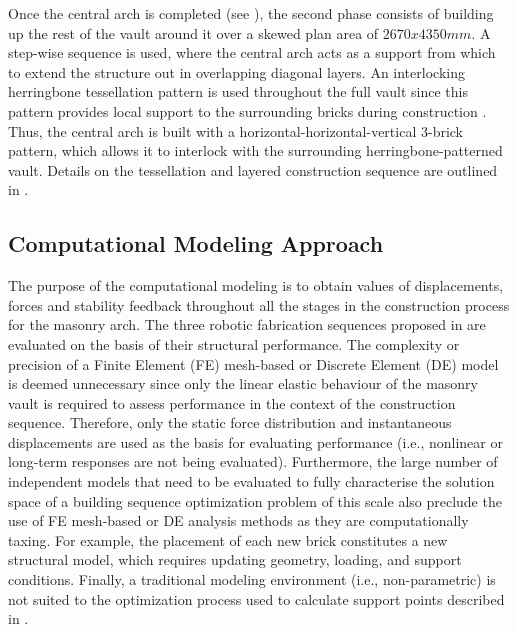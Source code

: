 Once the central arch is completed (see ), the second phase consists of building up the rest of the vault around it over a skewed plan area of $2670 x 4350 mm$. A step-wise sequence is used, where the central arch acts as a support from which to extend the structure out in overlapping diagonal layers.  An interlocking herringbone tessellation pattern is used throughout the full vault since this pattern provides local support to the surrounding bricks during construction \cite{paris_statics_2020, pizzigoni_herringbone_2018}. Thus, the central arch is built with a horizontal-horizontal-vertical 3-brick pattern, which allows it to interlock with the surrounding herringbone-patterned vault. Details on the tessellation and layered construction sequence are outlined in \cite{parascho_robotic_2020}.

\subsection{Computational Modeling Approach}\label{sec:comp_model_approach}
The purpose of the computational modeling is to obtain values of displacements, forces and stability feedback throughout all the stages in the construction process for the masonry arch. The three robotic fabrication sequences proposed in  are evaluated on the basis of their structural performance. The complexity or precision of a Finite Element (FE) mesh-based or Discrete Element (DE) model is deemed unnecessary since only the linear elastic behaviour of the masonry vault is required to assess performance in the context of the construction sequence. Therefore, only the static force distribution and instantaneous displacements are used as the basis for evaluating performance (i.e., nonlinear or long-term responses are not being evaluated). Furthermore, the large number of independent models that need to be evaluated to fully characterise the solution space of a building sequence optimization problem of this scale also preclude the use of FE mesh-based or DE analysis methods as they are computationally taxing. For example, the placement of each new brick constitutes a new structural model, which requires updating geometry, loading, and support conditions. Finally, a traditional modeling environment (i.e., non-parametric) is not suited to the optimization process used to calculate support points described in .

